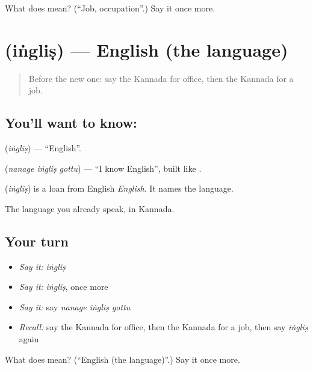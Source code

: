 \begin{tcolorbox}[breakable,colback=teal!4,colframe=teal!35!black,title={Before you move on}]
What does  mean? (\textquotedblleft{}Job, occupation\textquotedblright{}.) Say it once more.
\end{tcolorbox}
\section[\texorpdfstring{\kn{ಇಂಗ್ಲಿಷ್} (iṅgliṣ)}{ಇಂಗ್ಲಿಷ್ (iṅgliṣ)}]{ (iṅgliṣ) — English (the language)}

\label{lesson:KA-C92-english}



\begin{quote}
Before the new one: say the Kannada for office, then the Kannada for a job.
\end{quote}

\subsection*{You'll want to know: }
\textbf{} (\emph{iṅgliṣ}) — \textquotedblleft{}English\textquotedblright{}.

\textbf{  } (\emph{nanage iṅgliṣ gottu}) — \textquotedblleft{}I know English\textquotedblright{}, built like \textbf{  }.

\begin{cousinweb}
\textbf{} (\emph{iṅgliṣ}) is a loan from English \emph{English}. It names the language.
\end{cousinweb}

\begin{grammarlens}[title={What you've built}]
The language you already speak, in Kannada.
\end{grammarlens}

\subsection*{Your turn}
\begin{itemize}
\raggedright
  \item \emph{Say it:} \emph{iṅgliṣ}
  \item \emph{Say it:} \emph{iṅgliṣ}, once more
  \item \emph{Say it:} say \emph{nanage iṅgliṣ gottu}
  \item \emph{Recall:} say the Kannada for office, then the Kannada for a job, then say \emph{iṅgliṣ} again
\end{itemize}

\begin{tcolorbox}[breakable,colback=teal!4,colframe=teal!35!black,title={Before you move on}]
What does  mean? (\textquotedblleft{}English (the language)\textquotedblright{}.) Say it once more.
\end{tcolorbox}
